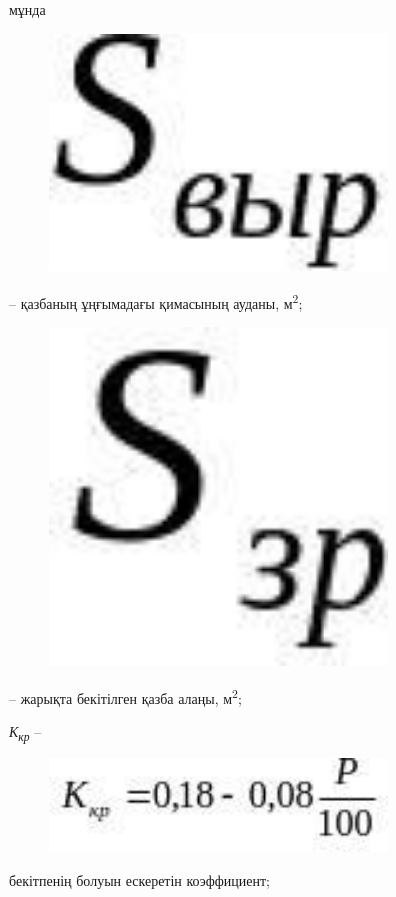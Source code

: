 мұнда \begin{figure}[H]
	\centering
	\includegraphics[width=0.8\textwidth]{assets/1299}
	\caption*{}
\end{figure} -- қазбаның ұңғымадағы
қимасының ауданы, м\textsuperscript{2};

\begin{figure}[H]
	\centering
	\includegraphics[width=0.8\textwidth]{assets/1300}
	\caption*{}
\end{figure} -- жарықта бекітілген қазба алаңы,
м\textsuperscript{2};

\emph{К\textsubscript{кр}} --\begin{figure}[H]
	\centering
	\includegraphics[width=0.8\textwidth]{assets/1301}
	\caption*{}
\end{figure}
бекітпенің болуын ескеретін коэффициент;

